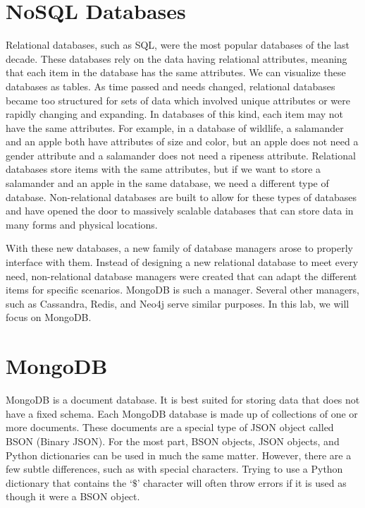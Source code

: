 \label{lab:mongodb}

\section*{NoSQL Databases}
Relational databases, such as SQL, were the most popular databases of the last decade. 
These databases rely on the data having relational attributes, meaning that each item in the database has the same attributes. 
We can visualize these databases as tables. 
As time passed and needs changed, relational databases became too structured for sets of data which involved unique attributes or were rapidly changing and expanding.
In databases of this kind, each item may not have the same attributes. 
For example, in a database of wildlife, a salamander and an apple both have attributes of size and color, but an apple does not need a gender attribute and a salamander does not need a ripeness attribute. 
Relational databases store items with the same attributes, but if we want to store a salamander and an apple in the same database, we need a different type of database.
Non-relational databases are built to allow for these types of databases and have opened the door to massively scalable databases that can store data in many forms and physical locations.

With these new databases, a new family of database managers arose to properly interface with them. 
Instead of designing a new relational database to meet every need, non-relational database managers were created that can adapt the different items for specific scenarios. 
MongoDB is such a manager. 
Several other managers, such as Cassandra, Redis, and Neo4j serve similar purposes.
In this lab, we will focus on MongoDB.

\section*{MongoDB}
MongoDB is a document database.
It is best suited for storing data that does not have a fixed schema.
Each MongoDB database is made up of collections of one or more documents.
These documents are a special type of JSON object called BSON (Binary JSON).
For the most part, BSON objects, JSON objects, and Python dictionaries can be used in much the same matter.
However, there are a few subtle differences, such as with special characters.
Trying to use a Python dictionary that contains the `$\$$' character will often throw errors if it is used as though it were a BSON object.

